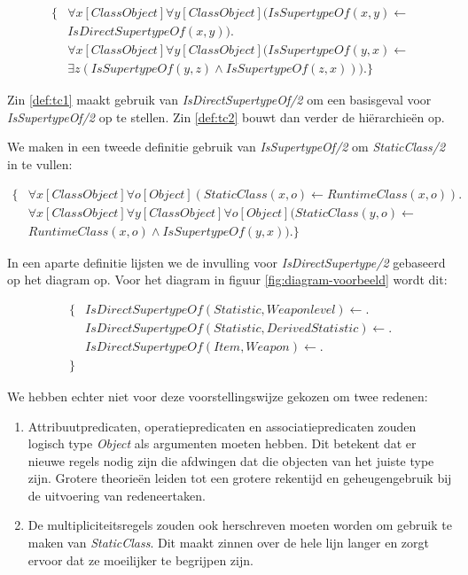 \begin{align}
\{
\nonumber &\forall{x}[ClassObject]\forall{y}[ClassObject](\mathit{IsSupertypeOf}(x,y) \leftarrow \\ &\mathit{IsDirectSupertypeOf}(x,y)).\label{def:tc1} \\
\nonumber &\forall{x}[ClassObject]\forall{y}[ClassObject](\mathit{IsSupertypeOf}(y,x) \leftarrow \\
&\exists{z}(\mathit{IsSupertypeOf(y,z)} \land \mathit{IsSupertypeOf}(z,x))).\label{def:tc2}
\}
\end{align}

\sloppy Zin \ref{def:tc1} maakt gebruik van \textit{IsDirectSupertypeOf/2} om een basisgeval voor \\ \textit{IsSupertypeOf/2} op te stellen. Zin \ref{def:tc2} bouwt dan verder de hi\"erarchie\"en op.

We maken in een tweede definitie gebruik van \textit{IsSupertypeOf/2} om \textit{StaticClass/2} in te vullen:

\begin{align*}
\{
&\forall{x}[ClassObject]\forall{o}[Object](StaticClass(x,o) \leftarrow RuntimeClass(x,o)). \\
&\forall{x}[ClassObject]\forall{y}[ClassObject]\forall{o}[Object](StaticClass(y,o) \leftarrow \\ &RuntimeClass(x,o) \land \mathit{IsSupertypeOf}(y,x)).
\}
\end{align*}

In een aparte definitie lijsten we de invulling voor \textit{IsDirectSupertype/2} gebaseerd op het diagram op. Voor het diagram in figuur \ref{fig:diagram-voorbeeld} wordt dit:

\begin{align*}
\{
&\mathit{IsDirectSupertypeOf}(Statistic,Weaponlevel) \leftarrow .\\
&\mathit{IsDirectSupertypeOf}(Statistic,DerivedStatistic) \leftarrow .\\
&\mathit{IsDirectSupertypeOf}(Item,Weapon) \leftarrow .\\
\}
\end{align*}

We hebben echter niet voor deze voorstellingswijze gekozen om twee redenen:

\begin{enumerate}
	\item Attribuutpredicaten, operatiepredicaten en associatiepredicaten zouden logisch type \textit{Object} als argumenten moeten hebben. Dit betekent dat er nieuwe regels nodig zijn die afdwingen dat die objecten van het juiste type zijn. Grotere theorie\"en leiden tot een grotere rekentijd en geheugengebruik bij de uitvoering van redeneertaken.
	\item De multipliciteitsregels zouden ook herschreven moeten worden om gebruik te maken van \textit{StaticClass}. Dit maakt zinnen over de hele lijn langer en zorgt ervoor dat ze moeilijker te begrijpen zijn.
\end{enumerate}

